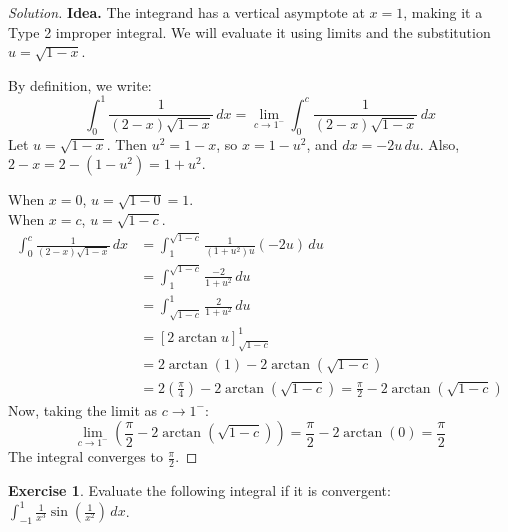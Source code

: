 \documentclass[11pt]{article}
\theoremstyle{definition}
\newtheorem{exercise}{Exercise}[section]
\newenvironment{solution}{\begin{proof}[Solution]}{\end{proof}}
\begin{document}
\begin{solution}
\textbf{Idea.} The integrand has a vertical asymptote at $x = 1$, making it a Type 2 improper integral. We will evaluate it using limits and the substitution $u = \sqrt{1-x}$.

By definition, we write:
\[
\int_0^1\frac{1}{(2-x)\sqrt{1-x}}\,dx = \lim_{c \to 1^-} \int_0^c \frac{1}{(2-x)\sqrt{1-x}}\,dx
\]
Let $u = \sqrt{1-x}$. Then $u^2 = 1-x$, so $x = 1-u^2$, and $dx = -2u \,du$.
Also, $2-x = 2 - (1-u^2) = 1+u^2$.

When $x = 0$, $u = \sqrt{1-0} = 1$. \\
When $x = c$, $u = \sqrt{1-c}$.
\begin{align*}
\int_0^c \frac{1}{(2-x)\sqrt{1-x}}\,dx &= \int_1^{\sqrt{1-c}} \frac{1}{(1+u^2)u} (-2u) \,du \\
&= \int_1^{\sqrt{1-c}} \frac{-2}{1+u^2} \,du \\
&= \int_{\sqrt{1-c}}^1 \frac{2}{1+u^2} \,du \\
&= \left[ 2\arctan u \right]_{\sqrt{1-c}}^1 \\
&= 2\arctan(1) - 2\arctan(\sqrt{1-c}) \\
&= 2\left(\frac{\pi}{4}\right) - 2\arctan(\sqrt{1-c}) = \frac{\pi}{2} - 2\arctan(\sqrt{1-c})
\end{align*}
Now, taking the limit as $c \to 1^-$:
\[
\lim_{c \to 1^-} \left( \frac{\pi}{2} - 2\arctan(\sqrt{1-c}) \right) = \frac{\pi}{2} - 2\arctan(0) = \frac{\pi}{2}
\]
The integral converges to $\frac{\pi}{2}$.
\end{solution}

\begin{exercise}
Evaluate the following integral if it is convergent: $\displaystyle \int_{-1}^1\frac{1}{x^3}\sin\left(\frac{1}{x^2}\right)\,dx$.
\end{exercise}
\end{document}
